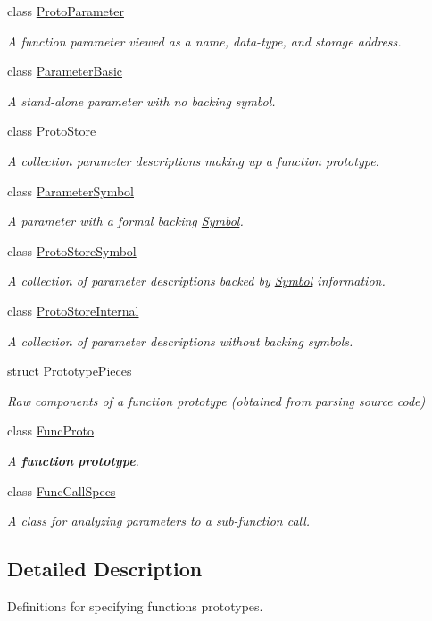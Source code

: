 \begin{DoxyCompactItemize}
class \mbox{\hyperlink{class_proto_parameter}{Proto\+Parameter}}
\begin{DoxyCompactList}\small\item\em A function parameter viewed as a name, data-\/type, and storage address. \end{DoxyCompactList}\item 
class \mbox{\hyperlink{class_parameter_basic}{Parameter\+Basic}}
\begin{DoxyCompactList}\small\item\em A stand-\/alone parameter with no backing symbol. \end{DoxyCompactList}\item 
class \mbox{\hyperlink{class_proto_store}{Proto\+Store}}
\begin{DoxyCompactList}\small\item\em A collection parameter descriptions making up a function prototype. \end{DoxyCompactList}\item 
class \mbox{\hyperlink{class_parameter_symbol}{Parameter\+Symbol}}
\begin{DoxyCompactList}\small\item\em A parameter with a formal backing \mbox{\hyperlink{class_symbol}{Symbol}}. \end{DoxyCompactList}\item 
class \mbox{\hyperlink{class_proto_store_symbol}{Proto\+Store\+Symbol}}
\begin{DoxyCompactList}\small\item\em A collection of parameter descriptions backed by \mbox{\hyperlink{class_symbol}{Symbol}} information. \end{DoxyCompactList}\item 
class \mbox{\hyperlink{class_proto_store_internal}{Proto\+Store\+Internal}}
\begin{DoxyCompactList}\small\item\em A collection of parameter descriptions without backing symbols. \end{DoxyCompactList}\item 
struct \mbox{\hyperlink{struct_prototype_pieces}{Prototype\+Pieces}}
\begin{DoxyCompactList}\small\item\em Raw components of a function prototype (obtained from parsing source code) \end{DoxyCompactList}\item 
class \mbox{\hyperlink{class_func_proto}{Func\+Proto}}
\begin{DoxyCompactList}\small\item\em A {\bfseries{function}} {\bfseries{prototype}}. \end{DoxyCompactList}\item 
class \mbox{\hyperlink{class_func_call_specs}{Func\+Call\+Specs}}
\begin{DoxyCompactList}\small\item\em A class for analyzing parameters to a sub-\/function call. \end{DoxyCompactList}\end{DoxyCompactItemize}


\subsection{Detailed Description}
Definitions for specifying functions prototypes. 

